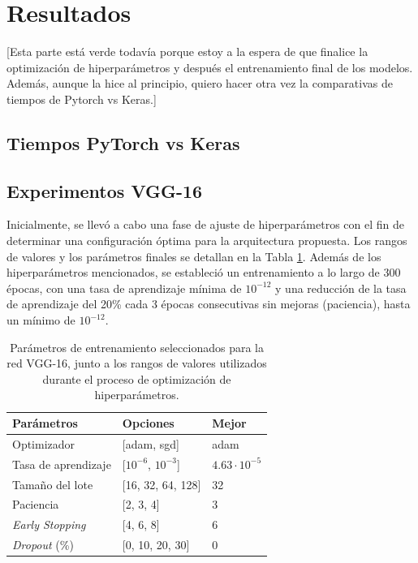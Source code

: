 \section{Resultados}

[Esta parte está verde todavía porque estoy a la espera de que finalice la optimización de hiperparámetros y después el entrenamiento final de los modelos. Además, aunque la hice al principio, quiero hacer otra vez la comparativas de tiempos de Pytorch vs Keras.]

\subsection{Tiempos PyTorch vs Keras}


\subsection{Experimentos VGG-16}

Inicialmente, se llevó a cabo una fase de ajuste de hiperparámetros con el fin de determinar una configuración óptima para la arquitectura propuesta. Los rangos de valores y los parámetros finales se detallan en la Tabla \ref{hiper-vgg}. Además de los hiperparámetros mencionados, se estableció un entrenamiento a lo largo de 300 épocas, con una tasa de aprendizaje mínima de $10^{-12}$ y una reducción de la tasa de aprendizaje del 20\% cada 3 épocas consecutivas sin mejoras (paciencia), hasta un mínimo de $10^{-12}$.

\begin{table}[h]
	\centering
	\begin{tabular}{lll}
	\hline
	Parámetros          & Opciones                 & Mejor \\ \hline
	Optimizador         & {[}adam, sgd{]}          & adam  \\
	Tasa de aprendizaje & {[}$10^{-6}$, $10^{-3}${]}         & $4.63 \cdot 10^{-5}$      \\
	Tamaño del lote    & {[}16, 32, 64, 128{]}    & 32      \\
	Paciencia           & {[}2, 3, 4{]}            & 3     \\
	\textit{Early Stopping}     & {[}4, 6, 8{]}            & 6     \\
	\textit{Dropout} (\%)    & {[}0, 10, 20, 30{]} &  0 \\ \hline
	\end{tabular}
	\caption{Parámetros de entrenamiento seleccionados para la red VGG-16, junto a los rangos de valores utilizados durante el proceso de optimización de hiperparámetros.}
	\label{hiper-vgg}
\end{table}

